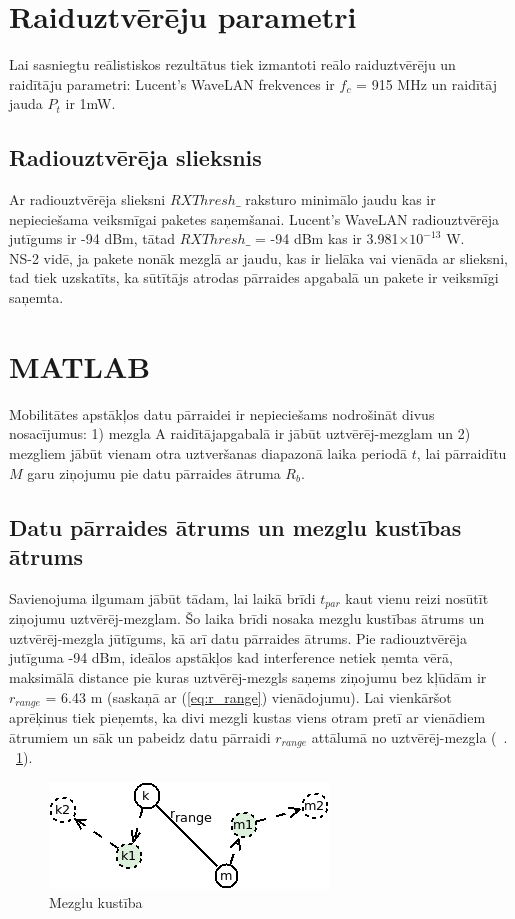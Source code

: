 \section{Raiduztvērēju parametri}
Lai sasniegtu reālistiskos rezultātus tiek izmantoti reālo raiduztvērēju un raidītāju  parametri: Lucent’s WaveLAN frekvences ir $f_{c}$ = 915 MHz un raidītāj jauda $P_{t}$ ir 1mW.

\subsection{Radiouztvērēja slieksnis}
Ar radiouztvērēja slieksni $RXThresh\_$ raksturo minimālo jaudu kas ir nepieciešama veiksmīgai paketes saņemšanai. Lucent’s WaveLAN radiouztvērēja jutīgums ir -94 dBm, tātad $RXThresh\_$ = -94 dBm kas ir 3.981$\times10^{-13}$ W.\\
NS-2 vidē, ja pakete nonāk mezglā ar jaudu, kas ir lielāka vai vienāda ar slieksni, tad tiek uzskatīts, ka sūtītājs atrodas pārraides apgabalā un pakete ir veiksmīgi saņemta.

\section{MATLAB}
Mobilitātes apstākļos datu pārraidei ir nepieciešams nodrošināt divus nosacījumus: 1) mezgla A raidītājapgabalā ir jābūt uztvērēj-mezglam un 2) mezgliem jābūt vienam otra uztveršanas diapazonā  laika periodā $t$, lai pārraidītu $M$ garu ziņojumu pie datu pārraides ātruma $R_{b}$.

\subsection{Datu pārraides ātrums un mezglu kustības ātrums}
Savienojuma ilgumam jābūt tādam, lai laikā brīdi $t_{par}$ kaut vienu reizi nosūtīt ziņojumu uztvērēj-mezglam. Šo laika brīdi nosaka mezglu kustības ātrums un uztvērēj-mezgla jūtīgums, kā arī datu pārraides ātrums. Pie radiouztvērēja jutīguma -94 dBm, ideālos apstākļos kad interference netiek ņemta vērā, maksimālā distance pie kuras uztvērēj-mezgls saņems ziņojumu bez kļūdām  ir $r_{range}$ = 6.43 m (saskaņā ar (\ref{eq:r_range}) vienādojumu). Lai vienkāršot aprēķinus tiek pieņemts, ka divi mezgli kustas viens otram pretī ar vienādiem ātrumiem un sāk un pabeidz datu pārraidi $r_{range}$ attālumā no uztvērēj-mezgla (\seename ~\figurename. ~\ref{fig:mezgli}).

\begin{figure}[!htb]
\centering
\includegraphics[scale=0.6]{./graph/mezgli.png}
\caption{Mezglu kustība}
\label{fig:mezgli}
\end{figure}

